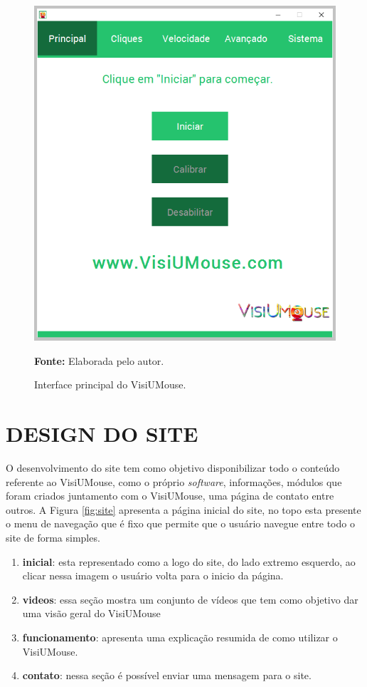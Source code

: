 \begin{figure}[htbp]
\caption{Interface principal do VisiUMouse.} 
\centering \includegraphics[scale=.5]{img/visiumouse-tela-principal-v216.png}

{\fontsize{11}{11}\selectfont \textbf{Fonte:} Elaborada pelo autor.}
\label{fig:interface-tecnologia}
\end{figure}

\section{DESIGN DO SITE}\label{Sub:site}

O desenvolvimento do site tem como objetivo disponibilizar todo o conteúdo referente ao VisiUMouse, como o próprio \textit{software}, informações, módulos que foram criados juntamento com o VisiUMouse, uma página de contato entre outros. A Figura \ref{fig:site} apresenta a página inicial do site, no topo esta presente o menu de navegação que é fixo que permite que o usuário navegue entre todo o site de forma simples.

\begin{enumerate}
\item \textbf{inicial}: esta representado como a logo do site, do lado extremo esquerdo, ao clicar nessa imagem o usuário volta para o inicio da página.
\item \textbf{videos}: essa seção mostra um conjunto de vídeos que tem como objetivo dar uma visão geral do VisiUMouse
\item \textbf{funcionamento}: apresenta uma explicação resumida de como utilizar o VisiUMouse.
\item \textbf{contato}: nessa seção é possível enviar uma mensagem para o site.
\end{enumerate}


